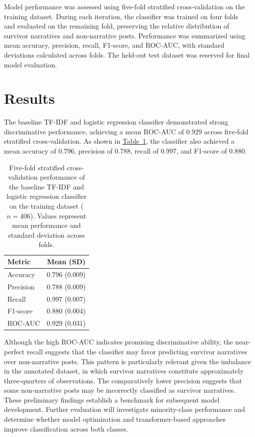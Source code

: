 \documentclass[11pt,a4paper]{article}
\begin{document}
Model performance was assessed using five-fold stratified cross-validation on the training dataset. During each iteration, the classifier was trained on four folds and evaluated on the remaining fold, preserving the relative distribution of survivor narratives and non-narrative posts. Performance was summarized using mean accuracy, precision, recall, F1-score, and ROC-AUC, with standard deviations calculated across folds. The held-out test dataset was reserved for final model evaluation.


\section{Results}

The baseline TF-IDF and logistic regression classifier demonstrated strong discriminative performance, achieving a mean ROC-AUC of 0.929 across five-fold stratified cross-validation. As shown in \hyperref[tab:baseline_cv]{Table~\ref*{tab:baseline_cv}}, the classifier also achieved a mean accuracy of 0.796, precision of 0.788, recall of 0.997, and F1-score of 0.880.

\begin{table}[!ht]
\centering
\small
\begin{tabular}{lc}
\hline
\textbf{Metric} & \textbf{Mean (SD)} \\
\hline
Accuracy  & 0.796 (0.009) \\
Precision & 0.788 (0.009) \\
Recall    & 0.997 (0.007) \\
F1-score  & 0.880 (0.004) \\
ROC-AUC   & 0.929 (0.031) \\
\hline
\end{tabular}
\caption{Five-fold stratified cross-validation performance of the baseline TF-IDF and logistic regression classifier on the training dataset ($n=406$). Values represent mean performance and standard deviation across folds.}
\label{tab:baseline_cv}
\end{table}

Although the high ROC-AUC indicates promising discriminative ability, the near-perfect recall suggests that the classifier may favor predicting survivor narratives over non-narrative posts. This pattern is particularly relevant given the imbalance in the annotated dataset, in which survivor narratives constitute approximately three-quarters of observations. The comparatively lower precision suggests that some non-narrative posts may be incorrectly classified as survivor narratives. These preliminary findings establish a benchmark for subsequent model development. Further evaluation will investigate minority-class performance and determine whether model optimization and transformer-based approaches improve classification across both classes.
\end{document}
